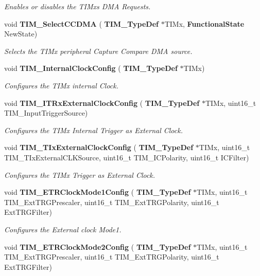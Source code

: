 \begin{DoxyCompactItemize}
\begin{DoxyCompactList}\small\item\em Enables or disables the T\+I\+Mx\textquotesingle{}s D\+MA Requests. \end{DoxyCompactList}\item 
void \textbf{ T\+I\+M\+\_\+\+Select\+C\+C\+D\+MA} (\textbf{ T\+I\+M\+\_\+\+Type\+Def} $\ast$T\+I\+Mx, \textbf{ Functional\+State} New\+State)
\begin{DoxyCompactList}\small\item\em Selects the T\+I\+Mx peripheral Capture Compare D\+MA source. \end{DoxyCompactList}\item 
void \textbf{ T\+I\+M\+\_\+\+Internal\+Clock\+Config} (\textbf{ T\+I\+M\+\_\+\+Type\+Def} $\ast$T\+I\+Mx)
\begin{DoxyCompactList}\small\item\em Configures the T\+I\+Mx internal Clock. \end{DoxyCompactList}\item 
void \textbf{ T\+I\+M\+\_\+\+I\+T\+Rx\+External\+Clock\+Config} (\textbf{ T\+I\+M\+\_\+\+Type\+Def} $\ast$T\+I\+Mx, uint16\+\_\+t T\+I\+M\+\_\+\+Input\+Trigger\+Source)
\begin{DoxyCompactList}\small\item\em Configures the T\+I\+Mx Internal Trigger as External Clock. \end{DoxyCompactList}\item 
void \textbf{ T\+I\+M\+\_\+\+T\+Ix\+External\+Clock\+Config} (\textbf{ T\+I\+M\+\_\+\+Type\+Def} $\ast$T\+I\+Mx, uint16\+\_\+t T\+I\+M\+\_\+\+T\+Ix\+External\+C\+L\+K\+Source, uint16\+\_\+t T\+I\+M\+\_\+\+I\+C\+Polarity, uint16\+\_\+t I\+C\+Filter)
\begin{DoxyCompactList}\small\item\em Configures the T\+I\+Mx Trigger as External Clock. \end{DoxyCompactList}\item 
void \textbf{ T\+I\+M\+\_\+\+E\+T\+R\+Clock\+Mode1\+Config} (\textbf{ T\+I\+M\+\_\+\+Type\+Def} $\ast$T\+I\+Mx, uint16\+\_\+t T\+I\+M\+\_\+\+Ext\+T\+R\+G\+Prescaler, uint16\+\_\+t T\+I\+M\+\_\+\+Ext\+T\+R\+G\+Polarity, uint16\+\_\+t Ext\+T\+R\+G\+Filter)
\begin{DoxyCompactList}\small\item\em Configures the External clock Mode1. \end{DoxyCompactList}\item 
void \textbf{ T\+I\+M\+\_\+\+E\+T\+R\+Clock\+Mode2\+Config} (\textbf{ T\+I\+M\+\_\+\+Type\+Def} $\ast$T\+I\+Mx, uint16\+\_\+t T\+I\+M\+\_\+\+Ext\+T\+R\+G\+Prescaler, uint16\+\_\+t T\+I\+M\+\_\+\+Ext\+T\+R\+G\+Polarity, uint16\+\_\+t Ext\+T\+R\+G\+Filter)

\end{DoxyCompactItemize}

